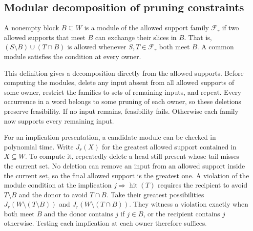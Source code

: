 \subsection{Modular decomposition of pruning constraints}
\label{app:pruning-modules}

A nonempty block $B\subseteq W$ is a module of the allowed support
family $\mathcal F_r$ if two allowed supports that meet $B$ can
exchange their slices in $B$. That is, $(S\setminus B)\cup(T\cap B)$
is allowed whenever $S,T\in\mathcal F_r$ both meet $B$. A common
module satisfies the condition at every owner.

This definition gives a decomposition directly from the allowed
supports. Before computing the modules, delete any input absent
from all allowed supports of some owner, restrict the families to
sets of remaining inputs, and repeat. Every occurrence in a word
belongs to some pruning of each owner, so these deletions preserve
feasibility. If no input remains, feasibility fails. Otherwise
each family now supports every remaining input.

For an implication presentation, a candidate module can be checked
in polynomial time. Write $J_r(X)$ for the greatest allowed support
contained in $X\subseteq W$. To compute it, repeatedly delete a
head still present whose tail misses the current set. No deletion
can remove an input from an allowed support inside the current set,
so the final allowed support is the greatest one. A violation of
the module condition at the implication $j\Rightarrow\operatorname{hit}(T)$
requires the recipient to avoid $T\setminus B$ and the donor to
avoid $T\cap B$. Take their greatest possibilities
$J_r(W\setminus(T\setminus B))$ and $J_r(W\setminus(T\cap B))$.
They witness a violation exactly when both meet $B$ and the donor
contains $j$ if $j\in B$, or the recipient contains $j$ otherwise.
Testing each implication at each owner therefore suffices.

